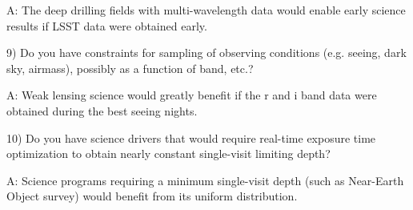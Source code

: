 A: The deep drilling fields with multi-wavelength data would enable early science results
if LSST data were obtained early.

9) Do you have constraints for sampling of observing conditions (e.g. seeing, dark sky,
airmass), possibly as a function of band, etc.?

A: Weak lensing science would greatly benefit if the r and i band data were obtained during
the best seeing nights.

10) Do you have science drivers that would require real-time exposure time optimization
to obtain nearly constant single-visit limiting depth?

A: Science programs requiring a minimum single-visit depth (such as Near-Earth Object
survey) would benefit from its uniform distribution. 


\navigationbar
